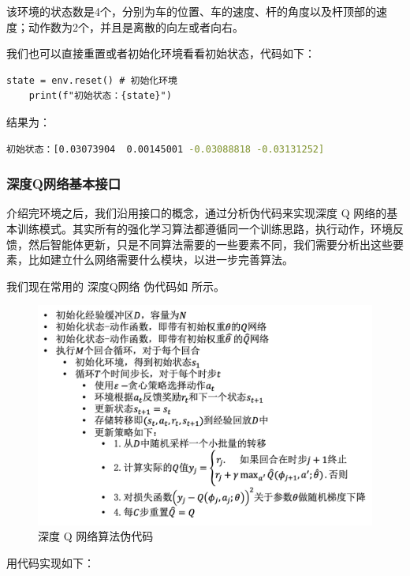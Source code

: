 该环境的状态数是4个，分别为车的位置、车的速度、杆的角度以及杆顶部的速度；动作数为2个，并且是离散的向左或者向右。

我们也可以直接重置或者初始化环境看看初始状态，代码如下：

\begin{lstlisting}[style=Python]
    state = env.reset() # 初始化环境
    print(f"初始状态：{state}")
\end{lstlisting}

结果为：

\begin{lstlisting}[language=sh,basicstyle=\zihao{-5}\ttfamily] 
    初始状态：[0.03073904  0.00145001 -0.03088818 -0.03131252]
\end{lstlisting}

\subsubsection{深度Q网络基本接口} 

介绍完环境之后，我们沿用接口的概念，通过分析伪代码来实现深度 Q 网络的基本训练模式。其实所有的强化学习算法都遵循同一个训练思路，执行动作，环境反馈，然后智能体更新，只是不同算法需要的一些要素不同，我们需要分析出这些要素，比如建立什么网络需要什么模块，以进一步完善算法。

我们现在常用的 深度Q网络 伪代码如 所示。

\begin{figure}[htb]
    \centering
    \includegraphics[width=0.75\linewidth]{res/ch7/assets/dqn.png}
    \caption{深度 Q 网络算法伪代码}
    \label{fig:dqn}
\end{figure}

用代码实现如下：

